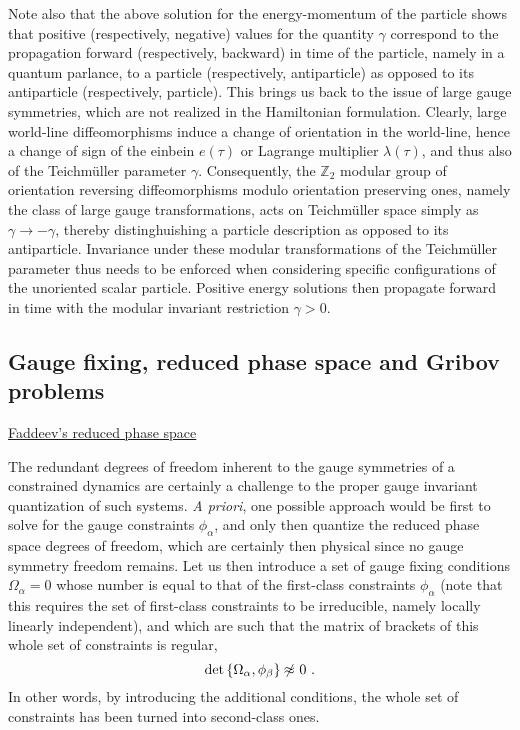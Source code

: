 \documentclass[a4paper,11pt]{article}
\def\Z{\mathbb Z}
\begin{document}
Note also that the above solution for the energy-momentum of the particle
shows that positive (respectively, negative) values for the quantity $\gamma$
correspond to the propagation forward (respectively, backward) in time of the
particle, namely in a quantum parlance, to a particle (respectively, 
antiparticle) as opposed to its antiparticle (respectively, particle). 
This brings us back to the
issue of large gauge symmetries, which are not realized in the Hamiltonian
formulation. Clearly, large world-line diffeomorphisms induce a change
of orientation in the world-line, hence a change of sign of the einbein
$e(\tau)$ or Lagrange multiplier $\lambda(\tau)$, and thus also of
the Teichm\"uller parameter $\gamma$. Consequently, the $\Z_2$ modular
group of orientation reversing diffeomorphisms modulo orientation preserving
ones, namely the class of large gauge transformations, acts on Teichm\"uller
space simply as $\gamma\rightarrow -\gamma$, thereby dis\-tin\-ghui\-shing a
particle description as opposed to its antiparticle.\cite{JG1} Invariance under
these modular transformations of the Teichm\"uller parameter thus needs to
be enforced when considering specific configurations of the unoriented
scalar particle. Positive energy solutions then propagate forward in time
with the modular invariant restriction $\gamma>0$.

\subsection{Gauge fixing, reduced phase space and Gribov problems}
\label{Subsect5.3}

\vspace{10pt}

\noindent\underline{Faddeev's reduced phase space}

\vspace{5pt}

The redundant degrees of freedom inherent to the gauge symmetries of
a constrained dynamics are certainly a challenge to the proper gauge invariant
quantization of such systems. {\sl A priori\/}, one possible approach would
be first to solve for the gauge constraints $\phi_\alpha$, and only then
quantize the reduced phase space degrees of freedom, which are certainly
then physical since no gauge symmetry freedom remains. Let us then introduce
a set of gauge fixing conditions $\Omega_\alpha=0$ whose number is equal to 
that of the first-class constraints $\phi_\alpha$ (note that this requires
the set of first-class constraints to be irreducible, namely locally
linearly independent), and which are such that
the matrix of brackets of this whole set of constraints is regular,
\begin{equation}
{\rm det}\,\{\Omega_\alpha,\phi_\beta\}\not{\!\!\approx}\ 0\ .
\label{eq:2ndclass}
\end{equation}
In other words, by introducing the additional conditions, the whole
set of constraints has been turned into second-class ones.
\end{document}
